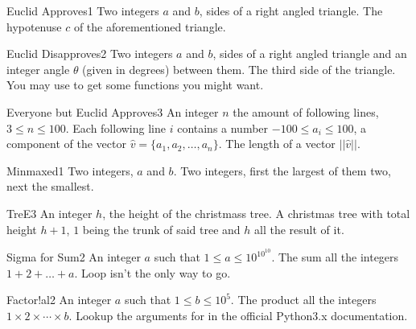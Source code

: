 \begin{task}{Euclid Approves}{1}
\In
Two integers $a$ and $b$, sides of a right angled triangle.
\Out
The hypotenuse $c$ of the aforementioned triangle.

\begin{ExampleIO}
\end{ExampleIO}
\end{task}

\begin{task}{Euclid Disapproves}{2}
\In
Two integers $a$ and $b$, sides of a right angled triangle and an integer angle
$\theta$ (given in degrees) between them.
\Out
The third side of the triangle.
\Hint
You may use  to get some functions you might want.
\end{task}

\begin{task}{Everyone but Euclid Approves}{3}
\In
An integer $n$ the amount of following lines, $3 \leq n \leq 100$. 
Each following line $i$ contains a number $-100 \leq a_i \leq 100$, a 
component of the vector $\hat{v} = \{a_1, a_2, \dots, a_n\}$.
\Out
The length of a vector $||\hat{v}||$.
\end{task}

\begin{task}{Minmaxed}{1}
\In
Two integers, $a$ and $b$.
\Out
Two integers, first the largest of them two, next the smallest.
\end{task}

\begin{task}{TreE}{3}
\In
An integer $h$, the height of the christmass tree.
\Out
A christmas tree with total height $h + 1$, $1$ being the trunk of said
tree and $h$ all the result of it.
\begin{ExampleIO}
\end{ExampleIO}
\end{task}

\begin{task}{Sigma for Sum}{2}
\In
An integer $a$ such that $1 \leq a \leq 10^{10^{10}}$.
\Out
The sum all the integers $1 + 2 + \dots + a$.
\Hint
Loop isn't the only way to go.
\end{task}

\begin{task}{Factor!al}{2}
\In
An integer $a$ such that $1 \leq b \leq 10^{5}$.
\Out
The product all the integers $1 \times 2 \times \cdots \times b$.
\Hint
Lookup the arguments for  in the official Python3.x documentation.
\end{task}

